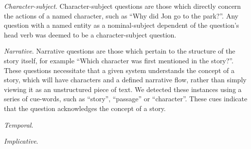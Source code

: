 \documentclass[11pt]{article}
\begin{document}
\textit{Character-subject}. Character-subject questions are those which directly concern the actions of a named character, such as ``Why did Jon go to the park?''. Any question with a named entity as a nominal-subject dependent of the question's head verb was deemed to be a character-subject question.

\textit{Narrative}. Narrative questions are those which pertain to the structure of the story itself, for example ``Which character was first mentioned in the story?''. These questions necessitate that a given system understands the concept of a story, which will have characters and a defined narrative flow, rather than simply viewing it as an unstructured piece of text. We detected these instances using a series of cue-words, such as ``story'', ``passage'' or ``character''. These cues indicate that the question acknowledges the concept of a story.

\textit{Temporal}.

\textit{Implicative}.





\end{document}
